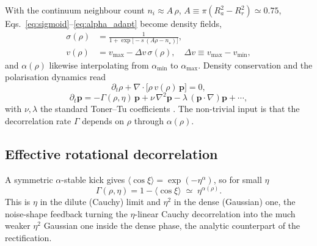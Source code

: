 \documentclass[11pt,a4paper]{article}
\begin{document}
With the continuum neighbour count $n_i \approx A\,\rho$,
$A \equiv \pi(R_a^2 - R_r^2) \simeq 0.75$,
Eqs.~\eqref{eq:sigmoid}--\eqref{eq:alpha_adapt} become density
fields,
\begin{align}
\sigma(\rho) & = \frac{1}{1 + \exp\!\bigl[-s\,(A\rho - n_\star)\bigr]},
\label{eq:sigma_rho} \\
v(\rho) & = v_{\max} - \Delta v\,\sigma(\rho),
\quad \Delta v \equiv v_{\max} - v_{\min},
\label{eq:v_rho}
\end{align}
and $\alpha(\rho)$ likewise interpolating from $\alpha_{\min}$
to $\alpha_{\max}$. Density conservation and the polarisation
dynamics read
\begin{equation}
\partial_t \rho + \nabla\!\cdot\!\bigl[\rho\,v(\rho)\,
\mathbf p\bigr] = 0,
\label{eq:rho_eq}
\end{equation}
\begin{equation}
\partial_t \mathbf p = -\Gamma(\rho, \eta)\,\mathbf p
   + \nu\,\nabla^2\mathbf p
   - \lambda\,(\mathbf p\!\cdot\!\nabla)\mathbf p
   + \cdots,
\label{eq:p_eq}
\end{equation}
with $\nu, \lambda$ the standard Toner--Tu coefficients
\citep{TonerTu1995, TonerTu2012}. The non-trivial input is that
the decorrelation rate $\Gamma$ depends on $\rho$ through
$\alpha(\rho)$.

\subsection{Effective rotational decorrelation}

A symmetric $\alpha$-stable kick gives $\langle\cos\xi\rangle =
\exp(-\eta^\alpha)$, so for small $\eta$
\begin{equation}
\Gamma(\rho, \eta) = 1 - \langle\cos\xi\rangle
   \;\simeq\; \eta^{\alpha(\rho)}.
\label{eq:gamma_eta}
\end{equation}
This is $\eta$ in the dilute (Cauchy) limit and $\eta^2$ in the
dense (Gaussian) one, the noise-shape feedback turning the
$\eta$-linear Cauchy decorrelation into the much weaker $\eta^2$
Gaussian one inside the dense phase, the analytic counterpart of
the rectification.
\end{document}
